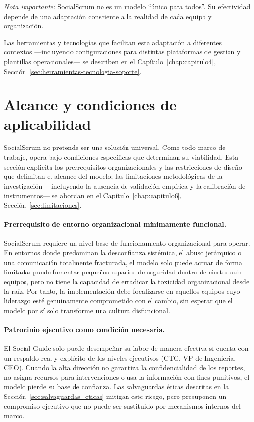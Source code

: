 \emph{Nota importante:} SocialScrum no es un modelo ``único para todos''.
Su efectividad depende de una adaptación consciente a la realidad de cada equipo y organización.

Las herramientas y tecnologías que facilitan esta adaptación a diferentes contextos ---incluyendo configuraciones para distintas plataformas de gestión y plantillas operacionales--- se describen en el Capítulo~\ref{chap:capitulo4}, Sección~\ref{sec:herramientas-tecnologia-soporte}.

\section{Alcance y condiciones de aplicabilidad}
\label{sec:alcance-condiciones-aplicabilidad}

SocialScrum no pretende ser una solución universal.
Como todo marco de trabajo, opera bajo condiciones específicas que determinan su viabilidad.
Esta sección explicita los prerrequisitos organizacionales y las restricciones de diseño que delimitan el alcance del modelo; las limitaciones metodológicas de la investigación ---incluyendo la ausencia de validación empírica y la calibración de instrumentos--- se abordan en el Capítulo~\ref{chap:capitulo6}, Sección~\ref{sec:limitaciones}.

\paragraph{Prerrequisito de entorno organizacional mínimamente funcional.}
SocialScrum requiere un nivel base de funcionamiento organizacional para operar.
En entornos donde predominan la desconfianza sistémica, el abuso jerárquico o una comunicación totalmente fracturada, el modelo solo puede actuar de forma limitada: puede fomentar pequeños espacios de seguridad dentro de ciertos sub-equipos, pero no tiene la capacidad de erradicar la toxicidad organizacional desde la raíz.
Por tanto, la implementación debe focalizarse en aquellos equipos cuyo liderazgo esté genuinamente comprometido con el cambio, sin esperar que el modelo por sí solo transforme una cultura disfuncional.

\paragraph{Patrocinio ejecutivo como condición necesaria.}
El Social Guide solo puede desempeñar su labor de manera efectiva si cuenta con un respaldo real y explícito de los niveles ejecutivos (CTO, VP de Ingeniería, CEO).
Cuando la alta dirección no garantiza la confidencialidad de los reportes, no asigna recursos para intervenciones o usa la información con fines punitivos, el modelo pierde su base de confianza.
Las salvaguardas éticas descritas en la Sección~\ref{sec:salvaguardas_eticas} mitigan este riesgo, pero presuponen un compromiso ejecutivo que no puede ser sustituido por mecanismos internos del marco.

